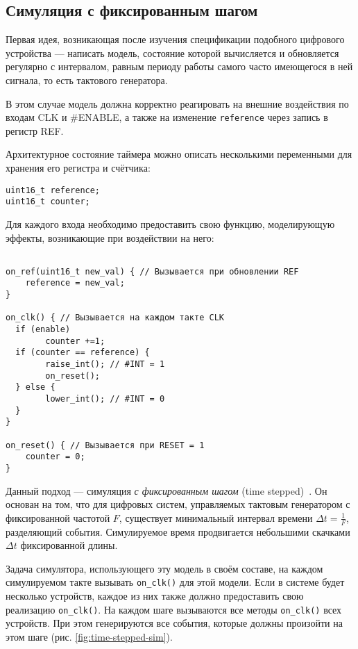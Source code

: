 \subsection{Симуляция с фиксированным шагом}\label{sec:time-stepped}

Первая идея, возникающая после изучения спецификации подобного цифрового устройства — написать модель, состояние которой вычисляется и обновляется регулярно с интервалом, равным периоду работы самого часто имеющегося в ней сигнала, то есть тактового генератора.

В этом случае модель должна корректно реагировать на внешние воздействия по входам CLK и \#ENABLE, а также на изменение \texttt{reference} через запись в регистр REF.

Архитектурное состояние таймера можно описать несколькими переменными для хранения его регистра и счётчика:

\begin{lstlisting}
uint16_t reference;
uint16_t counter;
\end{lstlisting}

Для каждого входа необходимо предоставить свою функцию, моделирующую эффекты, возникающие при воздействии на него:

\begin{lstlisting}

on_ref(uint16_t new_val) { // Вызывается при обновлении REF
    reference = new_val;
}

on_clk() { // Вызывается на каждом такте CLK
  if (enable)
        counter +=1;
  if (counter == reference) {
        raise_int(); // #INT = 1
        on_reset();
  } else {
        lower_int(); // #INT = 0
  }
}

on_reset() { // Вызывается при RESET = 1
    counter = 0;
}
\end{lstlisting}


Данный подход — симуляция \textit{с фиксированным шагом} (\abbr time stepped)~\cite{ferscha-1995-pdes}. Он основан на том, что для цифровых систем, управляемых тактовым генератором с фиксированной частотой $F$, существует минимальный интервал времени $\Delta t = \frac{1}{F}$, разделяющий события. Симулируемое время продвигается небольшими скачками $\Delta t$ фиксированной длины.

Задача симулятора, использующего эту модель в своём составе, на каждом симулируемом такте вызывать \texttt{on_clk()} для этой модели. Если в системе будет несколько устройств, каждое из них также должно предоставить свою реализацию \texttt{on_clk()}. На каждом шаге вызываются все методы \texttt{on_clk()} всех устройств. При этом генерируются все события, которые должны произойти на этом шаге (рис. \ref{fig:time-stepped-sim}).

